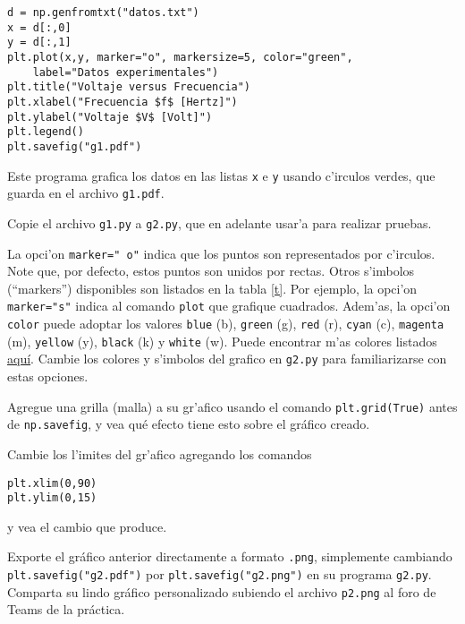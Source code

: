 \documentclass[11pt]{exam}
\begin{document}
\begin{questions}
\begin{verbatim}
d = np.genfromtxt("datos.txt")
x = d[:,0]
y = d[:,1]
plt.plot(x,y, marker="o", markersize=5, color="green", 
	label="Datos experimentales")
plt.title("Voltaje versus Frecuencia")
plt.xlabel("Frecuencia $f$ [Hertz]")
plt.ylabel("Voltaje $V$ [Volt]")
plt.legend()
plt.savefig("g1.pdf")
\end{verbatim}

Este programa grafica los datos en las listas \texttt{x} e \texttt{y} usando c'irculos verdes, que guarda en el archivo \texttt{g1.pdf}.
\item Copie el archivo \texttt{g1.py} a \texttt{g2.py}, que en adelante usar'a para realizar pruebas. 
\item La opci'on \texttt{marker="\,o"} indica que los puntos son representados por c'irculos. Note que, por defecto, estos puntos son unidos por rectas. Otros s'imbolos (``markers'') disponibles son listados en la tabla \ref{t}. Por ejemplo, la opci'on \texttt{marker="s"} indica al comando \texttt{plot} que grafique cuadrados. 
Adem'as, la opci'on \texttt{color} puede adoptar los valores \texttt{blue} (b), \texttt{green} (g), \texttt{red} (r), \texttt{cyan} (c), \texttt{magenta} (m), \texttt{yellow} (y), \texttt{black} (k) y \texttt{white} (w). Puede encontrar m'as colores listados \href{http://matplotlib.org/examples/color/named_colors.html}{aqu\'i}. Cambie los colores y s'imbolos del grafico en \texttt{g2.py} para familiarizarse con estas opciones.

\item Agregue una grilla (malla) a su gr'afico usando el comando \texttt{plt.grid(True)} antes de \texttt{np.savefig}, y vea qué efecto tiene esto sobre el gráfico creado.
\item Cambie los l'imites del gr'afico agregando los comandos

\begin{verbatim}
plt.xlim(0,90)
plt.ylim(0,15)
\end{verbatim}
y vea el cambio que produce.


\item Exporte el gráfico anterior directamente a formato \texttt{.png}, simplemente cambiando \newline \texttt{plt.savefig("g2.pdf")} por \texttt{plt.savefig("g2.png")} en su programa \texttt{g2.py}. Comparta su lindo gráfico personalizado subiendo el archivo \texttt{p2.png} al foro de Teams de la práctica.


\end{questions}
\end{document}
